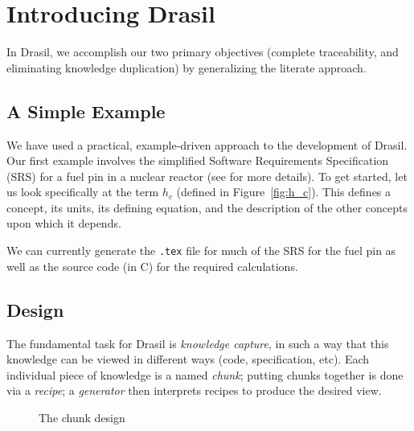 \documentclass{sig-alternate-05-2015}
\newcommand{\lss}{Drasil}
\begin{document}
\section{Introducing \lss} \label{sec:lss}

In \lss, we accomplish our two primary objectives (complete traceability, and
eliminating knowledge duplication) by generalizing the literate approach.

\subsection{A Simple Example} \label{ssec:example}

We have used a practical, example-driven approach to the development of \lss{}.
Our first example involves 
the simplified Software Requirements Specification (SRS) for a fuel pin in a
nuclear reactor (see \cite{SmithAndKoothoor2016} for more details). To get
started, let us look specifically at the term $h_c$ (defined in
Figure~\ref{fig:h_c}).  This defines a concept, its units, its
defining equation, and the description of the other concepts upon which it
depends.

We can currently generate the \verb|.tex| file for
much of the SRS for the fuel pin as well as the source code (in C) for the
required calculations.

\subsection{Design} \label{sssec:ex_how}

The fundamental task for \lss{} is \emph{knowledge capture}, in such a 
way that this knowledge can be viewed in different ways (code, specification,
etc).  Each individual piece of knowledge is a named \textit{chunk}; putting
chunks together is done via a \textit{recipe}; a \textit{generator} then
interprets recipes to produce the desired view.  

\begin{figure}
\begin{center}
\end{center}
\caption{The chunk design}
\label{fig:chunks}
\end{figure}
\end{document}
